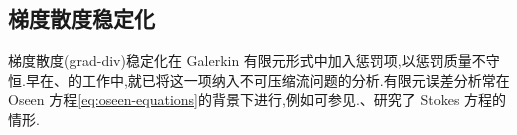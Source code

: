 \subsection{梯度散度稳定化}
\label{sec:stokes-grad-div-stabilization}

\begin{note}[文献回顾]\label{note:stokes-grad-div-literature}
梯度散度(grad-div)稳定化在 Galerkin 有限元形式中加入惩罚项,以惩罚质量不守恒.早在\textcite{FrancaHughes1988}、\textcite{HansboSzepessy1990}的工作中,就已将这一项纳入不可压缩流问题的分析.有限元误差分析常在 Oseen 方程\cref{eq:oseen-equations}的背景下进行,例如可参见\parencite{TobiskaVerfuerth1996,GelhardEtAl2005,RoosStynesTobiska2008,OlshanskiiLubeHeisterLowe2009}.\textcite{OlshanskiiReusken2004}、\textcite{JenkinsJohnLinkeRebholz2014}研究了 Stokes 方程的情形.
\end{note}

